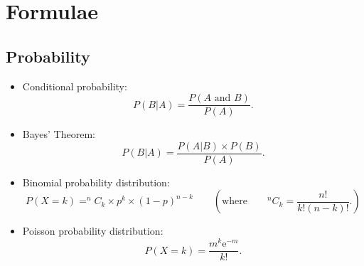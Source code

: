\documentclass[a4paper,12pt]{article}
\begin{document}





\section*{Formulae}
\subsection*{Probability}
\begin{itemize}

\item Conditional probability:
\begin{equation*}
P(B|A)=\frac{P\left( A\text{ and }B\right) }{P\left( A\right) }.
\end{equation*}


\item Bayes' Theorem:
\begin{equation*}
P(B|A)=\frac{P\left(A|B\right) \times P(B) }{P\left( A\right) }.
\end{equation*}


\item Binomial probability distribution:
\begin{equation*}
P(X = k) = ^{n}C_{k} \times p^{k} \times \left( 1-p\right) ^{n-k}\qquad \left( \text{where}\qquad
^{n}C_{k} =\frac{n!}{k!\left(n-k\right) !}. \right)
\end{equation*}

\item Poisson probability distribution:
\begin{equation*}
P(X = k) =\frac{m^{k}\mathrm{e}^{-m}}{k!}.
\end{equation*}
\end{itemize}
\end{document}
